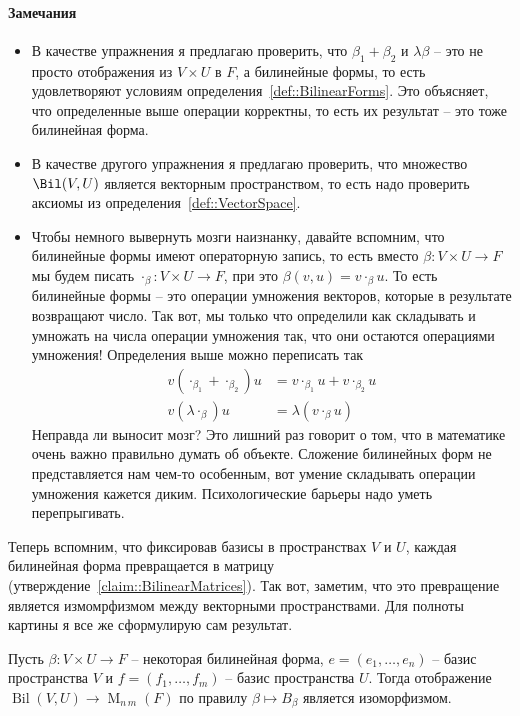 \paragraph{Замечания}
\begin{itemize}
\item В качестве упражнения я предлагаю проверить, что $\beta_1 + \beta_2$ и $\lambda\beta$ -- это не просто отображения из $V\times U$ в $F$, а билинейные формы, то есть удовлетворяют условиям определения~\ref{def::BilinearForms}.
Это объясняет, что определенные выше операции корректны, то есть их результат -- это тоже билинейная форма.

\item В качестве другого упражнения я предлагаю проверить, что множество $\Bil(V, U)$ является векторным пространством, то есть надо проверить аксиомы из определения~\ref{def::VectorSpace}.

\item Чтобы немного вывернуть мозги наизнанку, давайте вспомним, что билинейные формы имеют операторную запись, то есть вместо $\beta\colon V\times U\to F$ мы будем писать $\cdot_\beta\colon V\times U \to F$, при это $\beta(v, u) = v \cdot_\beta u$.
То есть билинейные формы -- это операции умножения векторов, которые в результате возвращают число.
Так вот, мы только что определили как складывать и умножать на числа операции умножения так, что они остаются операциями умножения!
Определения выше можно переписать так
\begin{align*}
v (\cdot_{\beta_1} + \cdot_{\beta_2}) u &= v \cdot_{\beta_1} u + v \cdot_{\beta_2} u\\
v(\lambda \cdot_\beta) u &= \lambda (v \cdot_\beta u)
\end{align*}
Неправда ли выносит мозг?
Это лишний раз говорит о том, что в математике очень важно правильно думать об объекте.
Сложение билинейных форм не представляется нам чем-то особенным, вот умение складывать операции умножения кажется диким.
Психологические барьеры надо уметь перепрыгивать.
\end{itemize}

Теперь вспомним, что фиксировав базисы в пространствах $V$ и $U$, каждая билинейная форма превращается в матрицу (утверждение~\ref{claim::BilinearMatrices}).
Так вот, заметим, что это превращение является измомрфизмом между векторными пространствами.
Для полноты картины я все же сформулирую сам результат.

\begin{claim}
Пусть $\beta\colon V\times U\to F$ -- некоторая билинейная форма,  $e = (e_1,\ldots,e_n)$ -- базис пространства $V$ и $f=(f_1,\ldots,f_m)$ -- базис пространства $U$.
Тогда отображение $\operatorname{Bil}(V,U)\to \operatorname{M}_{n\,m}(F)$ по правилу $\beta\mapsto B_\beta$ является изоморфизмом.
\end{claim}

